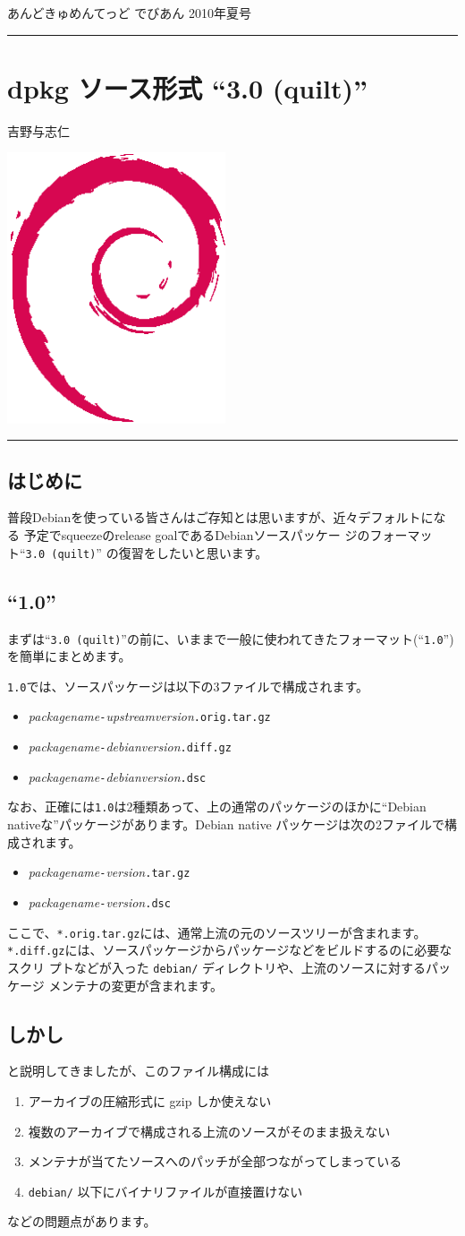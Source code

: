 \documentclass[mingoth,a4paper]{jsarticle}
\renewcommand{\dancersection}[2]{%
\newpage
あんどきゅめんてっど でびあん 2010年夏号
%
\vspace{0.1mm}\\
{\color{dancerlightblue}\rule{\hsize}{2mm}}

%
%
\begin{minipage}[t]{0.6\hsize}
\color{dancerdarkblue}
\vspace{1cm}
\section{#1}
\hfill{}#2\\
\end{minipage}
\begin{minipage}[t]{0.4\hsize}
\vspace{-2cm}
\hfill{}\includegraphics[height=8cm]{image200502/openlogo-nd.eps}\\
\vspace{-5cm}
\end{minipage}
%
%
{\color{dancerdarkblue}\rule{0.74\hsize}{2mm}}
%
\vspace{2cm}
}
\begin{document}
\dancersection{dpkg ソース形式 ``3.0 (quilt)''}{吉野与志仁}
\subsection{はじめに}
普段Debianを使っている皆さんはご存知とは思いますが、近々デフォルトになる
予定でsqueezeのrelease goalであるDebianソースパッケー
ジのフォーマット``\verb|3.0 (quilt)|'' の復習をしたいと思います。
\subsection{``1.0''}
まずは``\verb|3.0 (quilt)|''の前に、いままで一般に使われてきたフォーマット(``\verb|1.0|'')を簡単にまとめます。

\verb|1.0|では、ソースパッケージは以下の3ファイルで構成されます。
\begin{itemize}
 \item \textit{packagename}\verb|-|\textit{upstreamversion}\verb|.orig.tar.gz|
 \item \textit{packagename}\verb|-|\textit{debianversion}\verb|.diff.gz|
 \item \textit{packagename}\verb|-|\textit{debianversion}\verb|.dsc|
\end{itemize}

なお、正確には\verb|1.0|は2種類あって、上の通常のパッケージのほかに``Debian
nativeな''パッケージがあります。Debian native パッケージは次の2ファイルで構成されます。
\begin{itemize}
 \item \textit{packagename}\verb|-|\textit{version}\verb|.tar.gz|
 \item \textit{packagename}\verb|-|\textit{version}\verb|.dsc|
\end{itemize}

ここで、\verb|*.orig.tar.gz|には、通常上流の元のソースツリーが含まれます。
\verb|*.diff.gz|には、ソースパッケージからパッケージなどをビルドするのに必要なスクリ
プトなどが入った \verb|debian/| ディレクトリや、上流のソースに対するパッケージ
メンテナの変更が含まれます。

\subsection{しかし}
と説明してきましたが、このファイル構成には
\begin{enumerate}
 \item アーカイブの圧縮形式に gzip しか使えない
 \item 複数のアーカイブで構成される上流のソースがそのまま扱えない
 \item メンテナが当てたソースへのパッチが全部つながってしまっている
 \item \verb|debian/| 以下にバイナリファイルが直接置けない
\end{enumerate}
などの問題点があります。
\end{document}
